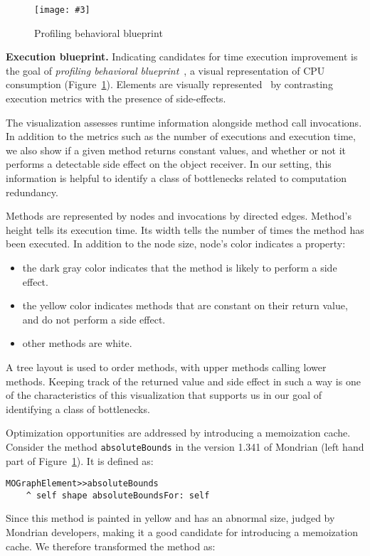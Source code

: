 \documentclass[runningheads]{llncs}
\newcommand{\ct}{\lstinline[backgroundcolor=\color{white},basicstyle=\footnotesize\ttfamily]}
\newcommand{\fig}[4]{
	\begin{figure}[#1]
		\centering
		\texttt{[image: \#3]}
		\caption{\label{fig:#3}#4}
	\end{figure}}
\newcommand{\figref}[1]{Figure~\ref{fig:#1}}
\newcommand{\myparagraph}[1]{\noindent \textbf{#1.}}
\begin{document}
\fig{}{1.0}{ProfilingBlueprint}{Profiling behavioral blueprint}

\myparagraph{Execution blueprint}
Indicating candidates for time execution improvement is the goal of \emph{profiling behavioral blueprint}~\cite{Berg10c}, a visual representation of CPU consumption (\figref{ProfilingBlueprint}). Elements are visually represented~\cite{Lanz03d} by contrasting execution metrics with the presence of side-effects.

The visualization assesses runtime information alongside method call invocations. In addition to the metrics such as the number of executions and execution time, we also show if a given method returns constant values, and whether or not it performs a detectable side effect on the object receiver. In our setting, this information is helpful to identify a class of bottlenecks related to computation redundancy.

Methods are represented by nodes and invocations by directed edges. Method's height tells its execution time. Its width tells the number of times the method has been executed. In addition to the node size, node's color indicates a property:
\begin{itemize}
\item the dark gray color indicates that the method is likely to perform a side effect. 
\item the yellow color indicates methods that are constant on their return value, and do not perform a side effect.
\item other methods are white.
\end{itemize}

A tree layout is used to order methods, with upper methods calling lower methods.
Keeping track of the returned value and side effect in such a way is one of the characteristics of this visualization that supports us in our goal of identifying a class of bottlenecks. 

Optimization opportunities are addressed by introducing a memoization cache.
Consider the method \ct{absoluteBounds} in the version 1.341 of Mondrian (left hand part of \figref{ProfilingBlueprint}). It is defined as:

\begin{lstlisting}
MOGraphElement>>absoluteBounds
	^ self shape absoluteBoundsFor: self
\end{lstlisting}

Since this method is painted in yellow and has an abnormal size, judged by Mondrian developers, making it a good candidate for introducing a memoization cache. We therefore transformed the method as:
\end{document}
